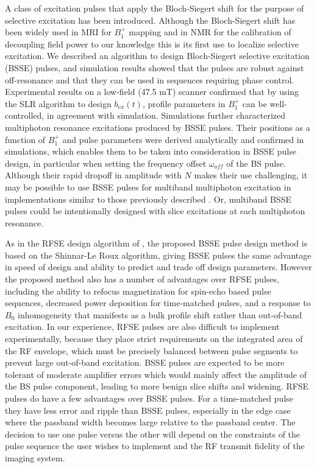 \documentclass{article}
\newcommand{\bext}{b_{ex}(t)}
\begin{document}
A class of excitation pulses that apply the Bloch-Siegert shift for the purpose of selective excitation
has been introduced. 
Although the Bloch-Siegert shift has been widely used in MRI for $B_1^+$ mapping \cite{Sacolick2010B1Shift, KhalighiAdiabaticMapping} and in NMR for the calibration of decoupling field power \cite{Claridge2016High-ResolutionEdition,Hung2020UsingSample} 
to our knowledge this is its first use to localize selective excitation.
We described an algorithm to design Bloch-Siegert selective excitation (BSSE) pulses,
and simulation results showed that the pulses are robust against off-resonance and that they can  be used in sequences requiring phase control. 
Experimental results on a low-field (47.5 mT) scanner confirmed that by using the SLR algorithm to design $\bext$,
profile parameters in $B_1^+$ can be well-controlled, in agreement with simulation. 
Simulations further characterized multiphoton resonance excitations produced by BSSE pulses. 
Their positions as a function of $B_1^+$ and pulse parameters were derived analytically
and confirmed in simulations, which enables them to be taken into consideration in BSSE pulse design,
in particular when setting the frequency offset $\omega_{off}$ of the BS pulse. 
Although their rapid dropoff in amplitude with $N$ makes their use challenging, 
it may be possible to use BSSE pulses for multiband multiphoton excitation in implementations similar to those previously described \cite{Han2020MultiphotonImplementation}.
Or, multiband BSSE pulses could be intentionally designed with slice excitations at each multiphoton resonance.
\par As in the RFSE design algorithm of \cite{Grissom2014B1+-selectiveAlgorithm}, 
the proposed BSSE pulse design method is based on the Shinnar-Le Roux algorithm, 
giving BSSE pulses the same advantage in speed of design and ability to predict and trade off design parameters. 
However the proposed method also has a number of advantages over RFSE pulses, 
including the ability to refocus magnetization for spin-echo based pulse sequences, 
decreased power deposition for time-matched pulses, 
and a response to $B_0$ inhomogeneity that manifests as a bulk profile shift rather than out-of-band excitation. 
In our experience, RFSE pulses are also difficult to implement experimentally, 
because they place strict requirements on the integrated area of the RF envelope, 
which must be precisely balanced between pulse segments to prevent large out-of-band excitation. BSSE pulses are expected to be more tolerant of moderate amplifier errors which would mainly affect the amplitude of the BS pulse component, leading to more benign slice shifts and widening.
RFSE pulses do have a few advantages over BSSE pulses. 
For a time-matched pulse they have less error and ripple than BSSE pulses, 
especially in the edge case where the passband width becomes large relative to the passband center. 
The decision to use one pulse versus the other will depend on the constraints of the pulse sequence 
the user wishes to implement and the RF transmit fidelity of the imaging system. 
\end{document}
